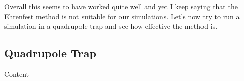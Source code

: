 Overall this seems to have worked quite well and yet I keep saying that the Ehrenfest method is not suitable for our simulations.
Let's now try to run a simulation in a quadrupole trap and see how effective the method is.

\subsection{Quadrupole Trap} \label{sec:EhrenfestQuad}

Content